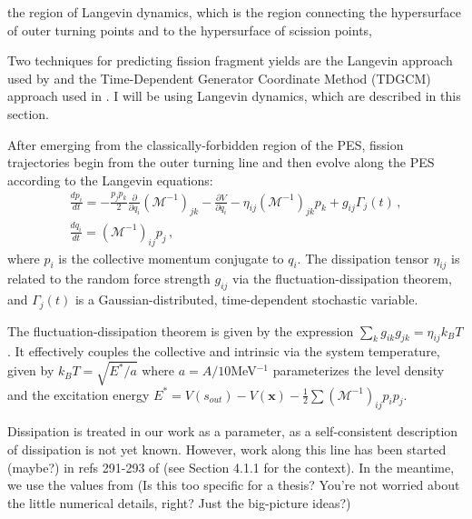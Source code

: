 the region of Langevin dynamics, which is the region connecting the hypersurface of outer turning points and to the hypersurface of scission points,

Two techniques for predicting fission fragment yields are the Langevin approach used by \cite{Sadhukhan2016} and the Time-Dependent Generator Coordinate Method (TDGCM) approach used in \cite{Younes2012}. I will be using Langevin dynamics, which are described in this section.

After emerging from the classically-forbidden region of the PES, fission trajectories begin from the outer turning
line and then evolve along the PES according to the Langevin equations:
\begin{gather}\label{eq:langevin} 
	\frac{dp_i}{dt} =  
	-\frac{p_j p_k}{2} \frac{\partial}{\partial q_i}\left(\mathcal{M}^{-1}\right)_{jk} 
	- \frac{\partial V}{\partial q_i}  - \eta_{ij}\left(\mathcal{M}^{-1}\right)_{jk} p_k + g_{ij}\Gamma_j(t) \,, \\ 
	\frac{dq_i}{dt} = 	\left(\mathcal{M}^{-1}\right)_{ij} p_j \,,  
\end{gather} 
where $p_i$ is the collective momentum conjugate to $q_i$. The dissipation
tensor $\eta_{ij}$ is related to the random force strength $g_{ij}$ via the
fluctuation-dissipation theorem, and $\Gamma_j(t)$ is a Gaussian-distributed,
time-dependent stochastic variable.

The fluctuation-dissipation theorem is given by the expression $\sum_k g_{ik}g_{jk} = \eta_{ij}k_BT$. It effectively couples the collective and intrinsic via the system temperature, given by $k_BT = \sqrt{E^*/a}$ where $a=A/10$MeV$^{-1}$ parameterizes the level density and the excitation energy $E^* = V(s_{out}) - V(\mathbf{x}) - \frac{1}{2}\sum\left(\mathcal{M}^{-1}\right)_{ij}p_i p_j$.

Dissipation is treated in our work as a parameter, as a self-consistent description of dissipation is not yet known. However, work along this line has been started (maybe?) in refs 291-293 of \cite{Schmidt2018} (see Section 4.1.1 for the context). In the meantime, we use the values from \cite{Sadhukhan2016} (Is this too specific for a thesis? You're not worried about the little numerical details, right? Just the big-picture ideas?)


